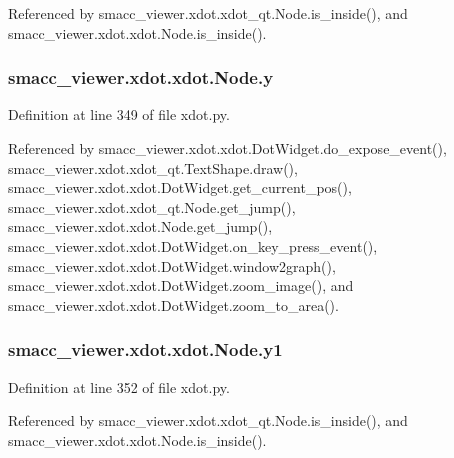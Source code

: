 Referenced by smacc\+\_\+viewer.\+xdot.\+xdot\+\_\+qt.\+Node.\+is\+\_\+inside(), and smacc\+\_\+viewer.\+xdot.\+xdot.\+Node.\+is\+\_\+inside().

\subsubsection[{\texorpdfstring{y}{y}}]{\setlength{\rightskip}{0pt plus 5cm}smacc\+\_\+viewer.\+xdot.\+xdot.\+Node.\+y}\hypertarget{classsmacc__viewer_1_1xdot_1_1xdot_1_1Node_a0bfff3077b9bcf79cc0a3280d90b92ac}{}\label{classsmacc__viewer_1_1xdot_1_1xdot_1_1Node_a0bfff3077b9bcf79cc0a3280d90b92ac}


Definition at line 349 of file xdot.\+py.



Referenced by smacc\+\_\+viewer.\+xdot.\+xdot.\+Dot\+Widget.\+do\+\_\+expose\+\_\+event(), smacc\+\_\+viewer.\+xdot.\+xdot\+\_\+qt.\+Text\+Shape.\+draw(), smacc\+\_\+viewer.\+xdot.\+xdot.\+Dot\+Widget.\+get\+\_\+current\+\_\+pos(), smacc\+\_\+viewer.\+xdot.\+xdot\+\_\+qt.\+Node.\+get\+\_\+jump(), smacc\+\_\+viewer.\+xdot.\+xdot.\+Node.\+get\+\_\+jump(), smacc\+\_\+viewer.\+xdot.\+xdot.\+Dot\+Widget.\+on\+\_\+key\+\_\+press\+\_\+event(), smacc\+\_\+viewer.\+xdot.\+xdot.\+Dot\+Widget.\+window2graph(), smacc\+\_\+viewer.\+xdot.\+xdot.\+Dot\+Widget.\+zoom\+\_\+image(), and smacc\+\_\+viewer.\+xdot.\+xdot.\+Dot\+Widget.\+zoom\+\_\+to\+\_\+area().

\subsubsection[{\texorpdfstring{y1}{y1}}]{\setlength{\rightskip}{0pt plus 5cm}smacc\+\_\+viewer.\+xdot.\+xdot.\+Node.\+y1}\hypertarget{classsmacc__viewer_1_1xdot_1_1xdot_1_1Node_a212fc443a78aadd8f291678689df4587}{}\label{classsmacc__viewer_1_1xdot_1_1xdot_1_1Node_a212fc443a78aadd8f291678689df4587}


Definition at line 352 of file xdot.\+py.



Referenced by smacc\+\_\+viewer.\+xdot.\+xdot\+\_\+qt.\+Node.\+is\+\_\+inside(), and smacc\+\_\+viewer.\+xdot.\+xdot.\+Node.\+is\+\_\+inside().


